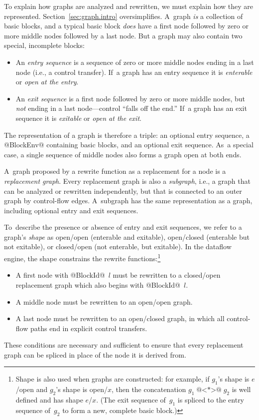 \documentclass[blockstyle,preprint,natbib,nocopyrightspace]{sigplanconf}
\newcommand\secref[1]{Section~\ref{sec:#1}}
\begin{document}
To explain how graphs are analyzed and rewritten, we must explain how
they are represented.
\secref{graph.intro} oversimplifies.
A~graph \emph{is} a collection of basic blocks, 
and a typical basic block \emph{does} have a first node followed by zero or
more middle nodes followed by a last node.
But a graph may also contain two special, incomplete
blocks:
\begin{itemize}
\item
An \emph{entry sequence} is a sequence of zero or more middle nodes
ending in a last node (i.e., a control transfer).
If~a graph has an entry sequence it is \emph{enterable} or
\emph{open at the entry}.
\item
An \emph{exit sequence} is a first node followed by zero or more
middle nodes, but \emph{not} ending in a last node---control ``falls
off the end.''
If~a graph has an exit sequence it is \emph{exitable} or
\emph{open at the exit}.
\end{itemize}
The representation of a graph is therefore a triple:
an optional entry sequence, a @BlockEnv@ containing basic blocks,
and an optional exit sequence.
As~a special case, a single sequence of middle nodes also forms a
graph open at both ends.

A~graph proposed by a rewrite function as a replacement for a node is
a \emph{replacement graph}.
Every replacement graph is also a \emph{subgraph}, i.e., a graph that
can be analyzed or rewritten independently, but that is connected to
an outer graph by control-flow edges.
A~subgraph has the same representation as a graph, including 
optional entry and exit sequences.

To~describe the presence or absence of entry and exit sequences, we
refer to a graph's \emph{shape} as open/open (enterable and exitable),
open/closed (enterable but not exitable), or closed/open (not
enterable, but exitable).  
In
the dataflow engine, the shape constrains the rewrite
functions:\footnote {Shape is also used when graphs are constructed:
for
example, if $g_1$'s shape is $e$/open and $g_2$'s shape is open/$x$,
then the concatenation $g_1 \mathbin{\mbox{@<*>@}} g_2$ is well defined and has shape
$e$/$x$.  (The exit sequence of~$g_1$ is spliced to the entry sequence
of~$g_2$ to form a new, complete basic block.)}
\begin{itemize}
\item
A first node with @BlockId@~$l$ must be rewritten to a closed/open
replacement graph which also begins with @BlockId@~$l$.
\item
A middle node must be rewritten to an open/open graph.
\item
A last node must be rewritten to an open/closed graph, in 
which all control-flow
paths end in explicit control transfers.
\end{itemize}
These conditions are necessary and sufficient to ensure that 
every replacement graph can be spliced in place of the node it is derived from.
\end{document}
